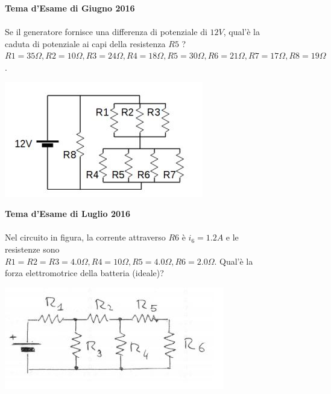 \begin{figure}[h!]
\textbf{Tema d'Esame di Giugno 2016}\\ \\
Se il generatore fornisce una differenza di potenziale di $12 V$, qual'è la caduta di potenziale ai capi della resistenza $R5$ ?
$R1= 35 \Omega, R2= 10 \Omega, R3= 24 \Omega, R4= 18 \Omega, R5= 30 \Omega, R6= 21 \Omega, R7=17 \Omega , R8=19 \Omega$.
	\begin{center}
		\includegraphics[scale=1]{ES5/GIU052016.jpg}
	\end{center}
\end{figure}

\begin{figure}[h!]
\textbf{Tema d'Esame di Luglio 2016}\\ \\
Nel circuito in figura, la corrente attraverso $R6$ è $i_6=1.2 A$ e le resistenze sono $R1=R2=R3=4.0 \Omega, R4= 10 \Omega, R5= 4.0 \Omega , R6= 2.0 \Omega$. Qual'è la forza elettromotrice della batteria (ideale)?
	\begin{center}
		\includegraphics[scale=0.8]{ES5/LUG052016.jpg}
	\end{center}
\end{figure}